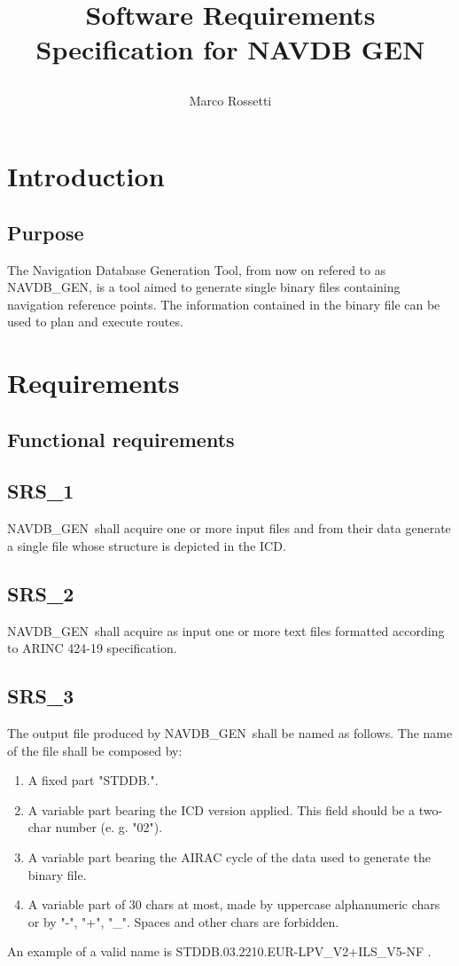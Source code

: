 \documentclass{scrreprt}
\title{Software Requirements Specification for NAVDB GEN 

\VERSION}
\author{Marco Rossetti}
\def\NAVDBGEN{NAVDB\_GEN}
\begin{document}
\maketitle
\tableofcontents
\chapter{Introduction}
\section{Purpose}
The Navigation Database Generation Tool, from now on refered to as \NAVDBGEN, is a tool aimed to
generate single binary files containing navigation reference points.
The information contained in the binary file can be used to plan and execute routes.
\chapter{Requirements}
\section{Functional requirements}
\setcounter{secnumdepth}{0}
\section{SRS\_1}
\label{SRS:1}
\NAVDBGEN\ shall acquire one or more input files and from their data generate a single file whose structure is depicted in the ICD.
\section{SRS\_2}
\label{SRS:2}
\NAVDBGEN\ shall acquire as input one or more text files formatted according to ARINC 424-19 specification.
\section{SRS\_3}
\label{SRS:3}
The output file produced by \NAVDBGEN\ shall be named as follows. The name of the file shall be composed by:
\begin{enumerate}
\item A fixed part "STDDB.".
\item A variable part bearing the ICD version applied. This field should be a two-char number (e. g. "02").
\item A variable part bearing the AIRAC cycle of the data used to generate the binary file.
\item A variable part of 30 chars at most, made by uppercase alphanumeric chars or by "-", "+", "\_". Spaces and other chars are forbidden.
\end{enumerate}
An example of a valid name is STDDB.03.2210.EUR-LPV\_V2+ILS\_V5-NF .
\end{document}
